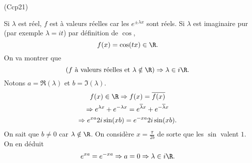 \begin{tiny}(Ccp21)\end{tiny} Si $\lambda$ est réel, $f$ est à valeurs réelles car les $e^{\pm \lambda x}$ sont réels. Si $\lambda$ est imaginaire pur (par exemple $\lambda = it$) par définition de $\cos$,
\[
  f(x) = \cos (tx) \in \R.
\]
On va montrer que 
\[
  \left( f \text{ à  valeurs réelles et } \lambda \notin \R \right) \Rightarrow \lambda \in i\R.
\]
Notons $a = \Re(\lambda)$ et $b = \Im(\lambda)$. 
\begin{multline*}
  f(x) \in \R 
  \Rightarrow f(x) = \overline{f(x)}\\
  \Rightarrow e^{\lambda x} + e^{-\lambda x} = e^{\overline{\lambda} x} + e^{-\overline{\lambda } x}\\
  \Rightarrow e^{x a} 2i\sin(x b) = e^{-x a} 2i\sin(x b). 
\end{multline*}
On sait que $b\neq 0$ car $\lambda \notin \R$. On considère $x = \frac{\pi}{2b}$ de sorte que les $\sin$ valent $1$. On en déduit
\[
 e^{x a} = e^{-x a} \Rightarrow a = 0 \Rightarrow \lambda \in i\R. 
\]
